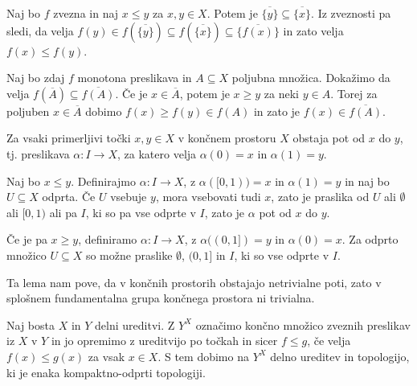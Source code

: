 \documentclass[mat1]{fmfdelo}
\begin{document}
\begin{dokaz}
    Naj bo $f$ zvezna in naj $x\leq y$ za $x, y \in X$. Potem je $\overline{\{y\}} \subseteq \overline{\{x\}}$. Iz zveznosti pa sledi, da velja $f(y) \in f(\overline{\{y\}})\subseteq f(\overline{\{x\}}) \subseteq \overline{\{f(x)\}}$ in zato velja  $f(x)\leq f(y)$.


    Naj bo zdaj $f$ monotona preslikava in $A\subseteq X$ poljubna množica. Dokažimo da velja $f(\overline{A}) \subseteq \overline{f(A)}$. 
    Če je $x\in\overline{A}$, potem je $x \geq y$ za neki $y\in A$. Torej za poljuben $x\in\overline{A}$ dobimo $f(x)\geq f(y)\in f(A)$ in zato je $f(x)\in \overline{f(A)}.$
    
    
\end{dokaz}


\begin{lema}
    Za vsaki primerljivi točki $x,y\in X$ v končnem prostoru $X$ obstaja pot od $x$ do $y$, tj. preslikava $\alpha\colon  I \rightarrow X$, za katero velja $\alpha(0)=x$ in $\alpha(1)=y$.
\label{lem:pot}
\end{lema}
\begin{dokaz}
    Naj bo $x \leq y$. Definirajmo $\alpha\colon I\rightarrow X$, z $\alpha([0,1))=x$ in $\alpha(1)=y$ in naj bo $U \subseteq X$ odprta. Če $U$ vsebuje $y$, mora vsebovati tudi $x$, 
    zato je praslika od $U$ ali $\emptyset$ ali $[0,1)$ ali pa $I$, ki so pa vse odprte v $I$, zato je $\alpha$ pot od $x$ do $y$.

    Če je pa $x \geq y$, definiramo $\alpha\colon I\rightarrow X$, z $\alpha((0,1])=y$ in $\alpha(0)=x$. Za odprto množico $U\subseteq X$ so možne praslike $\emptyset$, $(0,1]$ in $I$, ki so vse odprte v $I$.
\end{dokaz}
Ta lema nam pove, da v končnih prostorih obstajajo netrivialne poti, zato v splošnem fundamentalna grupa končnega prostora ni trivialna.

Naj bosta $X$ in $Y$ delni ureditvi. Z $Y^X$ označimo končno množico zveznih preslikav iz $X$ v $Y$ in jo opremimo z ureditvijo po točkah in sicer $f\leq g$, če velja $f(x) \leq g(x)$ za vsak $x\in X$. S tem dobimo na $Y^X$ delno ureditev in topologijo, ki je enaka kompaktno-odprti topologiji.  %
\end{document}
